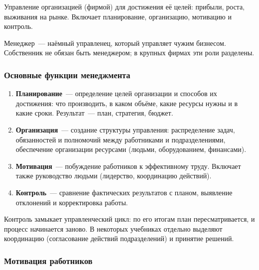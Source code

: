 \documentclass[12pt]{article}
\begin{document}
	\begin{definition}[Менеджмент]
		Управление организацией (фирмой) для достижения её целей: прибыли, роста, выживания на рынке. Включает планирование, организацию, мотивацию и контроль.
	\end{definition}

	\begin{note}
		Менеджер~--- наёмный управленец, который управляет чужим бизнесом. Собственник не обязан быть менеджером; в крупных фирмах эти роли разделены.
	\end{note}

	\subsubsection{Основные функции менеджмента}

	\begin{enumerate}
		\item \textbf{Планирование}~--- определение целей организации и способов их достижения: что производить, в каком объёме, какие ресурсы нужны и в какие сроки. Результат~--- план, стратегия, бюджет.
		\item \textbf{Организация}~--- создание структуры управления: распределение задач, обязанностей и полномочий между работниками и подразделениями, обеспечение организации ресурсами (людьми, оборудованием, финансами).
		\item \textbf{Мотивация}~--- побуждение работников к эффективному труду. Включает также руководство людьми (лидерство, координацию действий).
		\item \textbf{Контроль}~--- сравнение фактических результатов с планом, выявление отклонений и корректировка работы.
	\end{enumerate}

	\begin{note}
		Контроль замыкает управленческий цикл: по его итогам план пересматривается, и процесс начинается заново. В некоторых учебниках отдельно выделяют координацию (согласование действий подразделений) и принятие решений.
	\end{note}

	\subsubsection{Мотивация работников}
\end{document}
